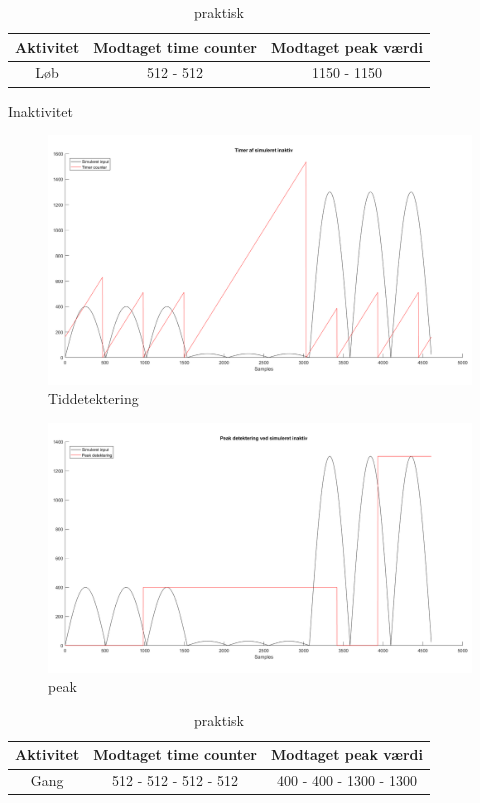 \begin{table}[H]
	\centering
	\begin{tabular}{ccc}
		\hline
		\rowcolor[HTML]{C0C0C0} 
		Aktivitet & Modtaget time counter & Modtaget peak værdi \\ \hline
		Løb & 512 - 512 & 1150 - 1150 \\ \hline
	\end{tabular}
	\caption{praktisk}
	\label{my-label}
\end{table}

Inaktivitet
\begin{figure}[H]
	\centering
	\includegraphics[scale=0.6]{figures/cDesign/test_timecount_inaktiv.png}
	\caption{Tiddetektering }
	\label{fig:algoritme_cykling}
\end{figure}

\begin{figure}[H]
	\centering
	\includegraphics[scale=0.6]{figures/cDesign/test_peak_inaktiv.png}
	\caption{peak}
	\label{fig:algoritme_cykling}
\end{figure}


\begin{table}[H]
	\centering
	\begin{tabular}{ccc}
		\hline
		\rowcolor[HTML]{C0C0C0} 
		Aktivitet & Modtaget time counter & Modtaget peak værdi \\ \hline
		Gang & 512 - 512 - 512 - 512 & 400 - 400 - 1300 - 1300 \\ \hline
	\end{tabular}
	\caption{praktisk}
	\label{my-label}
\end{table}






